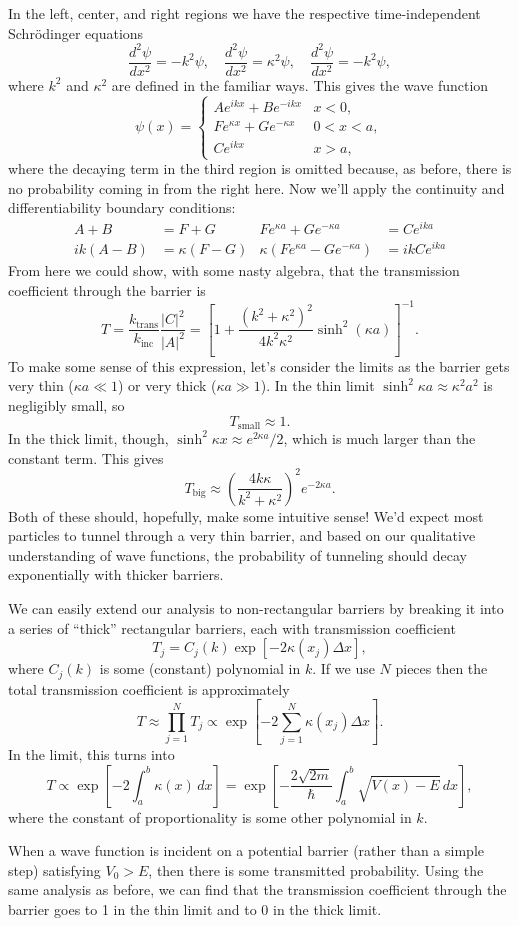 \documentclass[../p052main.tex]{subfiles}
\begin{document}
In the left, center, and right regions we have the respective time-independent Schrödinger equations
\[ \frac{d^2 \psi}{d x^2} = -k^2 \psi, \quad \frac{d^2 \psi}{d x^2} = \kappa^2 \psi, \quad \frac{d^2 \psi}{d x^2} = -k^2 \psi, \]
where $k^2$ and $\kappa^2$ are defined in the familiar ways.
This gives the wave function
\[ \psi(x) = \begin{cases} Ae^{ikx} + Be^{-ikx} & x < 0, \\ Fe^{\kappa x} + Ge^{-\kappa x} & 0 < x < a, \\ Ce^{ikx} & x > a, \end{cases} \]
where the decaying term in the third region is omitted because, as before, there is no probability coming in from the right here.
Now we'll apply the continuity and differentiability boundary conditions:
\begin{align*}
    A + B &= F + G & Fe^{\kappa a} + Ge^{-\kappa a} &= Ce^{ika} \\
    ik (A - B) &= \kappa (F - G) & \kappa (Fe^{\kappa a} - Ge^{-\kappa a}) &= ik C e^{ika}
\end{align*}
From here we could show, with some nasty algebra, that the transmission coefficient through the barrier is
\[ T = \frac{k_\textrm{trans}}{k_\textrm{inc}} \frac{|C|^2}{|A|^2} = \left[ 1 + \frac{(k^2 + \kappa^2)^2}{4k^2\kappa^2} \sinh^2 (\kappa a) \right]^{-1}. \]
To make some sense of this expression, let's consider the limits as the barrier gets very thin ($\kappa a \ll 1$) or very thick ($\kappa a \gg 1$).
In the thin limit $\sinh^2 \kappa a \approx \kappa^2 a^2$ is negligibly small, so
\[ T_\textrm{small} \approx 1. \]
In the thick limit, though, $\sinh^2 \kappa x \approx e^{2\kappa a} / 2$, which is much larger than the constant term.
This gives
\[ T_\textrm{big} \approx \left( \frac{4k \kappa}{k^2 + \kappa^2} \right)^2 e^{-2\kappa a}. \]
Both of these should, hopefully, make some intuitive sense!
We'd expect most particles to tunnel through a very thin barrier, and based on our qualitative understanding of wave functions, the probability of tunneling should decay exponentially with thicker barriers.

We can easily extend our analysis to non-rectangular barriers by breaking it into a series of ``thick'' rectangular barriers, each with transmission coefficient
\[ T_j = C_j(k) \exp [-2 \kappa (x_j) \Delta x], \]
where $C_j(k)$ is some (constant) polynomial in $k$.
If we use $N$ pieces then the total transmission coefficient is approximately
\[ T \approx \prod_{j=1}^{N} T_j \propto \exp \left[ -2 \sum_{j=1}^{N} \kappa (x_j) \Delta x \right]. \]
In the limit, this turns into
\[ T \propto \exp \left[ -2 \int_{a}^{b} \kappa (x) \,dx \right] = \exp \left[ -\frac{2\sqrt{2m}}{\hbar} \int_{a}^{b} \sqrt{V(x) - E} \,dx \right], \]
where the constant of proportionality is some other polynomial in $k$.

\begin{summary}
    When a wave function is incident on a potential barrier (rather than a simple step) satisfying $V_0 > E$, then there is some transmitted probability.
    Using the same analysis as before, we can find that the transmission coefficient through the barrier goes to 1 in the thin limit and to 0 in the thick limit.
\end{summary}
\end{document}
